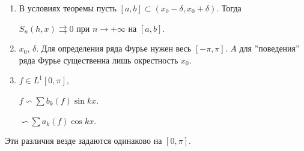 \documentclass{article}
\begin{document}
        \begin{enumerate}
        
            \item В условиях теоремы пусть $[a, b] \subset (x_0 - \delta, x_0 + \delta)$. Тогда
            
                $S_n(h, x) \rightrightarrows 0$ при $n \rightarrow +\infty$ на $[a, b]$.
                
            \item $x_0$, $\delta$. Для определения ряда Фурье нужен весь $[-\pi, \pi]$. $A$ для ''поведения'' ряда Фурье существенна лишь окрестность $x_0$.
            
            \item $f \in L^1 [0, \pi]$, 
            
                $f \backsim \sum b_k(f) \sin {kx}$.
            
                $\backsim \sum a_k(f) \cos {kx}$.
            
        \end{enumerate}
        
        Эти различия везде задаются одинаково на $[0, \pi]$.
        
\end{document}
